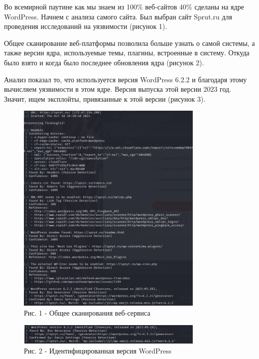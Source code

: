 \begin{multicols}{2}
Во всемирной паутине как мы знаем из 100\% веб-сайтов 40\% сделаны на
ядре WordPress. Начнем с анализа самого сайта. Был выбран сайт Sprut.ru
для проведения исследований на уязвимости (рисунок 1).

Общее сканирование веб-платформы позволила больше узнать о самой
системы, а также версии ядра, используемые темы, плагины, встроенные в
систему. Откуда было взято и когда было последнее обновления ядра
(рисунок 2).

Анализ показал то, что используется версия WordPress 6.2.2 и благодаря
этому вычисляем уязвимости в этом ядре. Версия выпуска этой версии 2023
год. Значит, ищем эксплойты, привязанные к этой версии (рисунок 3).
\end{multicols}

\begin{figure}[H]
	\centering
	\includegraphics[width=0.8\textwidth]{media/ict/image34}
	\caption*{Рис. 1 - Общее сканирования веб-сервиса}
\end{figure}

\begin{figure}[H]
	\centering
	\includegraphics[width=0.8\textwidth]{media/ict/image35}
	\caption*{Рис. 2 - Идентифицированная версия WordPress}
\end{figure}

